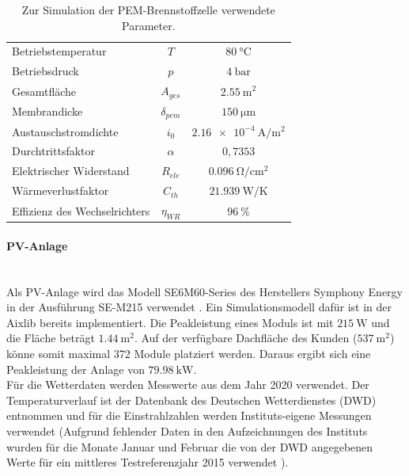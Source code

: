 \begin{table}[ht]
		\centering
		\caption{Zur Simulation der PEM-Brennstoffzelle verwendete Parameter.}
		\begin{tabular}{l c c}
		\toprule
		Betriebstemperatur & $T$ & $\SI{80}{\degreeCelsius}$\\
		Betriebsdruck & $p$ & $\SI{4}{\bar}$\\
		Gesamtfläche & $A_{ges}$ & $\SI{2,55}{\m\squared }$\\
		Membrandicke & $\delta_{pem}$ & $\SI{150}{\micro\m}$\\
		Austauschstromdichte & $i_0$ & $ \SI{2,16e-4}{\A\per\m\squared}$\\
		Durchtrittsfaktor & $\alpha$ & $0,7353$\\
		Elektrischer Widerstand & $R_{ele}$ & $\SI{0,096}{\ohm\per\cm\squared}$ \citep{tjarks_pem-elektrolyse-systeme_2017}\\	
		Wärmeverlustfaktor & $C_{th}$ & $\SI{21,939}{\W\per\K}$\\
		Effizienz des Wechselrichters & $\eta_{WR}$ & $\SI{96}{\%}$ \\
		\bottomrule
		\end{tabular}
		\label{tb:ParameterBrennstoffzelle}
\end{table}	

\paragraph{PV-Anlage}\ \\
Als PV-Anlage wird das Modell SE6M60-Series des Herstellers Symphony Energy in der Ausführung SE-M215 verwendet \citep{symphony_energy_coltd_se6m60_nodate}. Ein Simulationsmodell dafür ist in der Aixlib bereits implementiert. Die Peakleistung eines Moduls ist mit $\SI{215}{\W}$ und die Fläche beträgt $\SI{1,44}{\m\squared}$. Auf der verfügbare Dachfläche des Kunden ($\SI{537}{\m\squared}$) könne somit maximal 372 Module platziert werden. Daraus ergibt sich eine Peakleistung der Anlage von $\SI{79,98}{\kilo\W}$.\\
Für die Wetterdaten werden Messwerte aus dem Jahr 2020 verwendet. Der Temperaturverlauf ist der Datenbank des Deutschen Wetterdienstes (DWD) entnommen \citep{dwd_historische_nodate} und für die Einstrahlzahlen werden Instituts-eigene Messungen verwendet (Aufgrund fehlender Daten in den Aufzeichnungen des Instituts wurden für die Monate Januar und Februar die von der DWD angegebenen Werte für ein mittleres Testreferenzjahr 2015 verwendet \citep{dwd_klimaberatungsmodul_nodate}).

